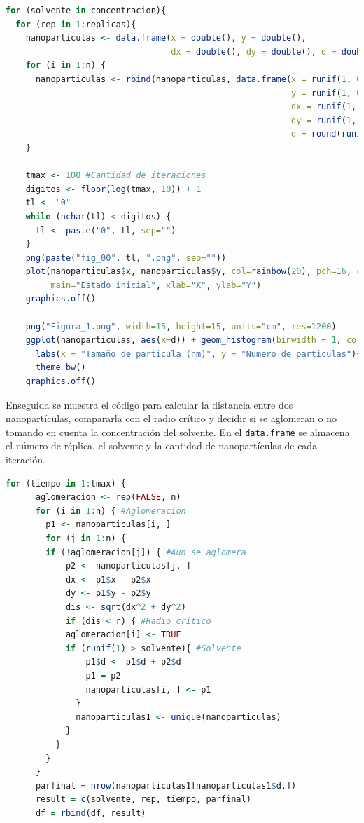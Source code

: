 \documentclass[3p,times,twocolumn]{elsarticle}
\begin{document}
\lstset{style=mystyle}
\begin{lstlisting}[language=R, caption= Fragmento del código para variar solvente y réplicas.]
for (solvente in concentracion){
  for (rep in 1:replicas){
    nanoparticulas <- data.frame(x = double(), y = double(),
                                 dx = double(), dy = double(), d = double())
    for (i in 1:n) {
      nanoparticulas <- rbind(nanoparticulas, data.frame(x = runif(1, 0, l),
                                                         y = runif(1, 0, l),
                                                         dx = runif(1, -v, v),
                                                         dy = runif(1, -v, v),
                                                         d = round(runif(1, 1, 5))))
    }
    
    tmax <- 100 #Cantidad de iteraciones
    digitos <- floor(log(tmax, 10)) + 1
    tl <- "0"
    while (nchar(tl) < digitos) {
      tl <- paste("0", tl, sep="")
    }
    png(paste("fig_00", tl, ".png", sep=""))
    plot(nanoparticulas$x, nanoparticulas$y, col=rainbow(20), pch=16, cex=nanoparticulas$d, xlim=c(-0.1, 10.1), ylim=c(-0.1, 10.1),
         main="Estado inicial", xlab="X", ylab="Y")
    graphics.off()
    
    png("Figura_1.png", width=15, height=15, units="cm", res=1200)
    ggplot(nanoparticulas, aes(x=d)) + geom_histogram(binwidth = 1, col='black', fill='blue')+
      labs(x = "Tamaño de particula (nm)", y = "Numero de particulas")+
      theme_bw()
    graphics.off() 
\end{lstlisting}

Enseguida se muestra el código para calcular la distancia entre dos nanopartículas, compararla con el radio crítico y decidir si se aglomeran o no tomando en cuenta la concentración del solvente. En el \texttt{data.frame} se almacena el número de réplica, el solvente y la cantidad de nanopartículas de cada iteración.

\begin{lstlisting}[language=R, caption= Fragmento del código para calcular distancia entre dos nanopartículas y decidir si se aglomeran.]
    for (tiempo in 1:tmax) {
      aglomeracion <- rep(FALSE, n)
      for (i in 1:n) { #Aglomeracion
        p1 <- nanoparticulas[i, ]
        for (j in 1:n) {
        if (!aglomeracion[j]) { #Aun se aglomera
            p2 <- nanoparticulas[j, ]
            dx <- p1$x - p2$x
            dy <- p1$y - p2$y
            dis <- sqrt(dx^2 + dy^2)
            if (dis < r) { #Radio critico
            aglomeracion[i] <- TRUE
            if (runif(1) > solvente){ #Solvente
                p1$d <- p1$d + p2$d
                p1 = p2
                nanoparticulas[i, ] <- p1 
              }
              nanoparticulas1 <- unique(nanoparticulas)
            }
          }
        }
      }
      parfinal = nrow(nanoparticulas1[nanoparticulas1$d,])
      result = c(solvente, rep, tiempo, parfinal)
      df = rbind(df, result)
\end{lstlisting}
\end{document}
